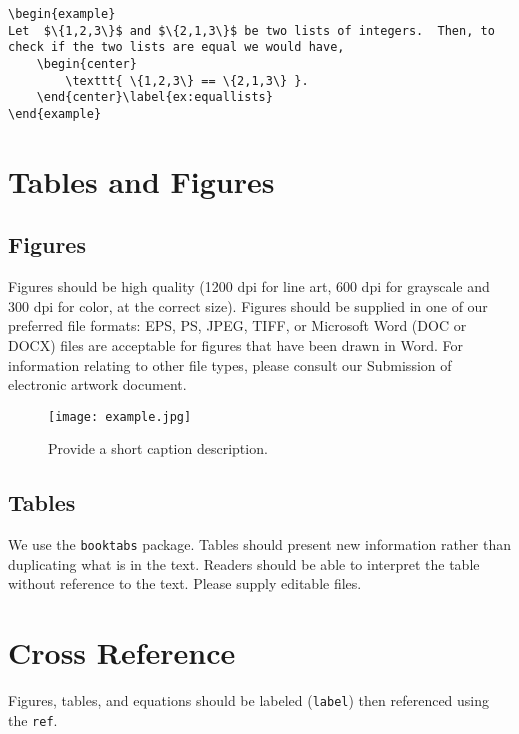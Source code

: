 \begin{verbatim}
\begin{example}
Let  $\{1,2,3\}$ and $\{2,1,3\}$ be two lists of integers.  Then, to check if the two lists are equal we would have,   
	\begin{center}
		\texttt{ \{1,2,3\} == \{2,1,3\} }.
	\end{center}\label{ex:equallists}
\end{example}
\end{verbatim}











\section{Tables and Figures}
 
 
 \subsection{Figures}
  Figures should be high quality (1200 dpi for line art, 600 dpi for grayscale and 300 dpi for color, at the correct size). Figures should be supplied in one of our preferred file formats: EPS, PS, JPEG, TIFF, or Microsoft Word (DOC or DOCX) files are acceptable for figures that have been drawn in Word. For information relating to other file types, please consult our Submission of electronic artwork document.
  
 \begin{figure}[h!] %
    \centering
    \texttt{[image: example.jpg]} 
    \caption{Provide a short caption description.}
    \label{fig:number}
 \end{figure}
 
 
 
 \subsection{Tables}
We use the \texttt{booktabs} package.  Tables should present new information rather than duplicating what is in the text. Readers should be able to interpret the table without reference to the text. Please supply editable files.




\section{Cross Reference}
Figures, tables, and equations should be labeled (\texttt{label}) then referenced using the \texttt{ref}. 
